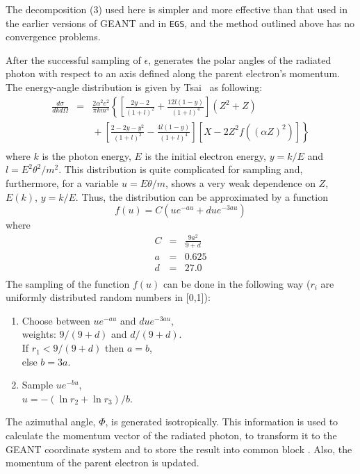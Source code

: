 \begin{bibunit}[unsrt]
The decomposition (3) used here is simpler and more effective
than that used in the earlier versions of GEANT and in {\tt EGS},
and the method outlined above has no convergence problems.
 
After the successful sampling of $\epsilon$,  generates the
polar angles
of the radiated photon with respect to an axis defined along the parent
electron's momentum.
The energy-angle distribution is given by 
Tsai~
as following:
\begin{eqnarray}
\frac{d \sigma}{dkd \Omega} 
& = & \frac{2 \alpha^{2}e^{2}}{\pi k m^{4}}
      \left\{ \left[ \frac{2y-2}{(1+l)^2}+\frac{12l(1-y)}{(1+l)^4}\right]
      (Z^{2}+Z) \nonumber  \right. \\
&   & \mbox{} + \left. \left[ \frac{2-2y-y^{2}}{(1+l)^2}- 
      \frac{4l(1-y)}{(1+l)^4}
      \right]
      \left[ X-2Z^{2}f((\alpha Z)^{2})\right]
      \right\} \nonumber \\
\end{eqnarray}
where $k$ is the photon energy, $E$ is the initial electron energy,
$y = k/E$ and $l = E^{2} \theta^{2}/m^{2}$. This distribution
is quite complicated for sampling and, furthermore, for a variable
$u = E \theta/m$, shows a very weak dependence on $Z$, $E(k)$,
$y = k/E$. Thus, the distribution can be approximated by a function
\begin{equation}
f(u) = C \left( u e^{-au} + d u e^{-3au} \right)
\end{equation}
where
\begin{eqnarray*}
C & = & \frac{9a^{2}}{9 + d} \\
a & = & 0.625 \\
d & = & 27.0 \\
\end{eqnarray*}
The sampling of the function $f(u)$ can be done in the following way
($r_{i}$ are uniformly distributed random numbers 
in [0,1]):
\begin{enumerate}
\item Choose between $u e^{-au}$ and $d u e^{-3au}$, \\
      weights: $9/(9+d)$ and $d/(9+d)$. \\
      If $r_{1} < 9/(9+d)$ then $a=b$, \\
      else $b=3a$.
\item Sample $u e^{-bu}$, \\
      $u=-(\ln r_{2} + \ln r_{3})/b$.
\end{enumerate}
The azimuthal angle, $\Phi$, is generated isotropically.
This information is used to calculate the momentum vector of the radiated
photon, to transform it to the GEANT coordinate system and 
to store the result into common block . Also, the momentum of the parent electron 
is updated.


\end{bibunit}
